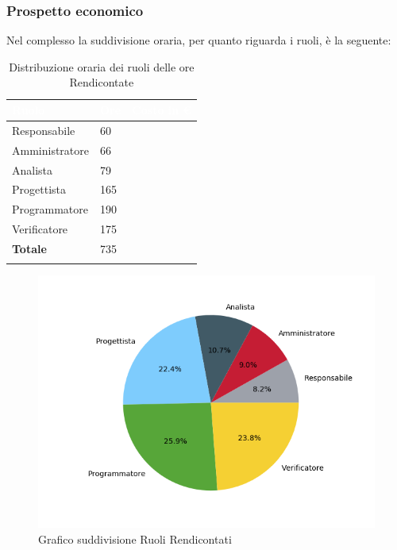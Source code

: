 \subsubsection{Prospetto economico}
Nel complesso la suddivisione oraria, per quanto riguarda i ruoli, è la seguente: 


\begin{longtable}{| C{.30\textwidth}| C{.15\textwidth}| C{.20\textwidth}|}
\hline
{}\textbf{\textcolor{white}{Ruolo}} & \textbf{\textcolor{white}{Ore}} & \textbf{\textcolor{white}{Costo in \euro}} \\
\hline
Responsabile & 60 &  \\
\hline
{}Amministratore & 66 &  \\
\hline
Analista & 79 &  \\
\hline
{}Progettista & 165 & \\
\hline 
Programmatore & 190 &  \\
\hline
{}Verificatore & 175 &  \\
\hline 
\textbf{Totale} & 735 & \\
\hline

\caption{Distribuzione oraria dei ruoli delle ore Rendicontate}
\label{Distribuzione oraria a carico del committente}
\end{longtable}

\begin{figure}[H]
	\centering
  		\includegraphics[width=1\linewidth]{./images/torta_to.png}
  		\caption{Grafico suddivisione Ruoli Rendicontati}
  		\label{fig:grafico suddivione ruoli}
\end{figure}


